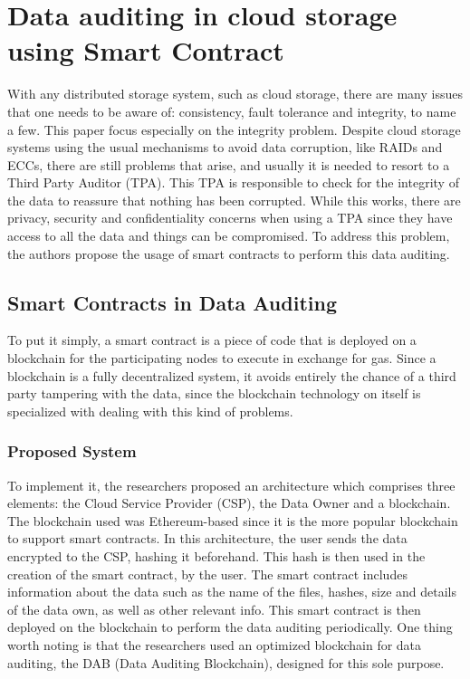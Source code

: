 \documentclass[14pt,oneside]{extreport}
\newcommand*\fpar{\hspace{1ex}}
\begin{document}
\chapter{\Large{Data auditing in cloud storage using Smart Contract \cite{paper4}}}
\fpar With any distributed storage system, such as cloud storage, there are many issues that one needs to be aware of: consistency, fault tolerance and integrity, to name a few. This paper focus especially on the integrity problem. Despite cloud storage systems using the usual mechanisms to avoid data corruption, like RAIDs and ECCs, there are still problems that arise, and usually it is needed to resort to a Third Party Auditor (TPA). This TPA is responsible to check for the integrity of the data to reassure that nothing has been corrupted. While this works, there are privacy, security and confidentiality concerns when using a TPA since they have access to all the data and things can be compromised. To address this problem, the authors propose the usage of smart contracts to perform this data auditing.
\section{Smart Contracts in Data Auditing}
To put it simply, a smart contract is a piece of code that is deployed on a blockchain for the participating nodes to execute in exchange for gas. Since a blockchain is a fully decentralized system, it avoids entirely the chance of a third party tampering with the data, since the blockchain technology on itself is specialized with dealing with this kind of problems.
\subsection{Proposed System}
To implement it, the researchers proposed an architecture which comprises three elements: the Cloud Service Provider (CSP), the Data Owner and a blockchain. The blockchain used was Ethereum-based since it is the more popular blockchain to support smart contracts. In this architecture, the user sends the data encrypted to the CSP, hashing it beforehand. This hash is then used in the creation of the smart contract, by the user. The smart contract includes information about the data such as the name of the files, hashes, size and details of the data own, as well as other relevant info. This smart contract is then deployed on the blockchain to perform the data auditing periodically. One thing worth noting is that the researchers used an optimized blockchain for data auditing, the DAB (Data Auditing Blockchain), designed for this sole purpose.
\end{document}
